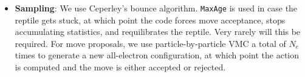 \begin{itemize}
\item \textbf{Sampling}:  We use Ceperley's bounce algorithm.  \texttt{MaxAge} is used in case the reptile gets stuck, at which point the code forces move acceptance, stops accumulating statistics, and requilibrates the reptile.  Very rarely will this be required.  For move proposals, we use particle-by-particle VMC a total of $N_e$ times to generate a new all-electron configuration, at which point the action is computed and the move is either accepted or rejected.  
\end{itemize}




